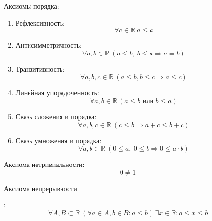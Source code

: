 Аксиомы порядка:
\begin{enumerate}
	\item Рефлексивность:
	\begin{equation*}
	\forall a \in \mathbb R \ a \leqslant a
	\end{equation*}
	
	\item Антисимметричность:
	\begin{equation*}
	\forall a, b \in \mathbb R \ (a \leqslant b, \ b \leqslant a \Rightarrow a = b)
	\end{equation*}
	
	\item Транзитивность:
	\begin{equation*}
	\forall a, b, c \in \mathbb R \ (a \leqslant b, b \leqslant c \Rightarrow a \leqslant c)
	\end{equation*}
	
	\item Линейная упорядоченность:
	\begin{equation*}
	\forall a, b \in \mathbb R \ (a \leqslant b \text{ или } b \leqslant a)
	\end{equation*}
	
	\item Связь сложения и порядка:
	\begin{equation*}
	\forall a, b, c \in \mathbb R \ (a \leqslant b \Rightarrow a + c \leqslant b + c)
	\end{equation*}
	
	\item Связь умножения и порядка:
	\begin{equation*}
	\forall a, b \in \mathbb R \ (0 \leqslant a, \ 0 \leqslant b \Rightarrow 0 \leqslant a \cdot b)
	\end{equation*}
\end{enumerate}

Аксиома нетривиальности:
\begin{equation*}
0 \neq 1
\end{equation*}

\hypertarget{eq:continuity_axiom}{Аксиома непрерывности}:
\begin{equation*}
\forall A, B \subset \mathbb R \ (\forall a \in A, b \in B \colon a \leqslant b) \
\exists x \in \mathbb R \colon a \leqslant x \leqslant b
\end{equation*}